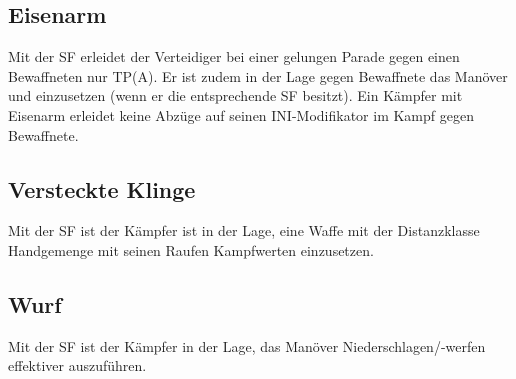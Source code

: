 \subsection[Eisenarm (Raufen oder Ringen)]{Eisenarm
}
{\sffamily\color{black}
Mit der SF  erleidet der Verteidiger bei
einer gelungen Parade gegen einen Bewaffneten nur TP(A). Er ist zudem
in der Lage gegen Bewaffnete das Manöver 
und  einzusetzen (wenn er die
entsprechende SF besitzt). Ein Kämpfer mit Eisenarm erleidet keine
Abzüge auf seinen INI-Modifikator im Kampf gegen Bewaffnete.}

\subsection[Versteckte Klinge (Raufen)]{Versteckte Klinge
}
{\sffamily\color{black}
Mit der SF  ist der Kämpfer ist
in der Lage, eine Waffe mit der Distanzklasse Handgemenge mit seinen
Raufen Kampfwerten einzusetzen.}

\subsection{Wurf}
{\sffamily\color{black}
Mit der SF  ist der Kämpfer in der Lage, das
Manöver Niederschlagen/-werfen effektiver auszuführen.}
